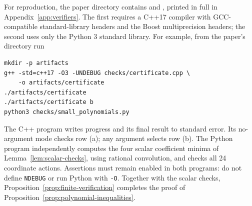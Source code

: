 For reproduction, the paper directory contains 
and , printed in full in
Appendix~\ref{app:verifiers}.  The first requires a C++17 compiler with
GCC-compatible standard-library headers and the Boost multiprecision
headers; the second uses only the Python 3 standard
library.  For example, from the paper's  directory run
\begin{verbatim}
mkdir -p artifacts
g++ -std=c++17 -O3 -UNDEBUG checks/certificate.cpp \
    -o artifacts/certificate
./artifacts/certificate
./artifacts/certificate b
python3 checks/small_polynomials.py
\end{verbatim}
The C++ program writes progress and its final result to standard error.
Its no-argument mode checks row (a); any argument selects row (b).
The Python program independently computes the four scalar coefficient
minima of Lemma~\ref{lem:scalar-checks}, using rational convolution, and
checks all 24 coordinate actions.  Assertions must remain enabled in both
programs: do not define \texttt{NDEBUG} or run Python with \texttt{-O}.
Together with the scalar checks, Proposition~\ref{prop:finite-verification}
completes the proof of Proposition~\ref{prop:polynomial-inequalities}.
